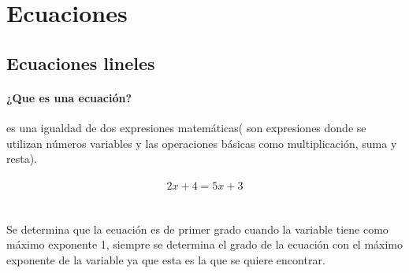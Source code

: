 \documentclass{article}
\begin{document}
\section{Ecuaciones}
\subsection{Ecuaciones lineles }
\paragraph{¿Que es una ecuación?}
es una igualdad de dos expresiones matemáticas( son expresiones donde se utilizan números variables y las operaciones básicas como multiplicación, suma y resta).
\\\\
\begin{equation}
2x+4=5x+3
\end{equation}
\\\\
Se determina que la ecuación es de primer grado cuando la variable tiene como máximo exponente 1, siempre se determina el grado de la ecuación con el  máximo exponente de la variable ya que esta es la que se quiere encontrar.
\end{document}
